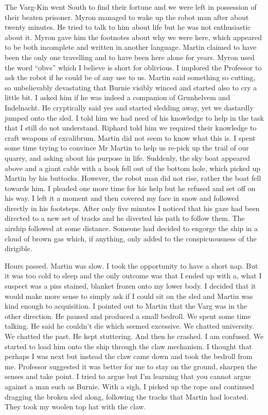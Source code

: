 The Varg-Kin went South to find their fortune and we were left in possession of their beaten prisoner. Myron managed to wake up the robot man after about twenty minutes. He tried to talk to him about life but he was not enthusiastic about it. Myron gave him the footnotes about why we were here, which appeared to be both incomplete and written in another language. Martin claimed to have been the only one travelling and to have been here alone for years. Myron used the word “obvs” which I believe is short for oblivious. I implored the Professor to ask the robot if he could be of any use to us. Martin said something so cutting, so unbelievably devastating that Burnie visibly winced and started also to cry a little bit. I asked him if he was indeed a companion of Grunhelvem and Indelnacht. He cryptically said yes and started sledding away, yet we dastardly jumped onto the sled. I told him we had need of his knowledge to help in the task that I still do not understand. Riphard told him we required their knowledge to craft weapons of excalibrum. Martin did not seem to know what this is. I spent some time trying to convince Mr Martin to help us re-pick up the trail of our quarry, and asking about his purpose in life. Suddenly, the sky boat appeared above and a giant cable with a hook fell out of the bottom hole, which picked up Martin by his buttocks. However, the robot man did not rise, rather the boat fell towards him. I pleaded one more time for his help but he refused and set off on his way. I left it a moment and then covered my face in snow and followed directly in his footsteps. After only five minutes I noticed that his gaze had been directed to a new set of tracks and he diverted his path to follow them. The airship followed at some distance. Someone had decided to engorge the ship in a cloud of brown gas which, if anything, only added to the conspicuousness of the dirigible.\medskip

Hours passed. Martin was slow. I took the opportunity to have a short nap. But it was too cold to sleep and the only outcome was that I ended up with a, what I suspect was a piss stained, blanket frozen onto my lower body. I decided that it would make more sense to simply ask if I could sit on the sled and Martin was kind enough to acquisition. I pointed out to Martin that the Varg was in the other direction. He paused and produced a small bedroll. We spent some time talking. He said he couldn’t die which seemed excessive. We chatted university. We chatted the past. He kept stuttering. And then he crashed. I am confused. We started to load him onto the ship through the claw mechanism. I thought that perhaps I was next but instead the claw came down and took the bedroll from me. Professor suggested it was better for me to stay on the ground, sharpen the senses and take point. I tried to argue but I’m learning that you cannot argue against a man such as Burnie. With a sigh, I picked up the rope and continued dragging the broken sled along, following the tracks that Martin had located. They took my woolen top hat with the claw.\medskip

